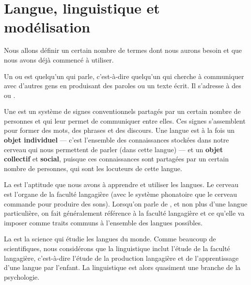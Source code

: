\section{Langue, linguistique et modélisation}\label{sec:1.1.7}

Nous allons définir un certain nombre de termes dont nous aurons besoin et que nous avons déjà commencé à utiliser.

\begin{styleLivreImportant}
Un  ou  est quelqu’un qui parle, c’est-à-dire quelqu’un qui cherche à communiquer avec d’autres gens en produisant des paroles ou un texte écrit. Il s’adresse à des  ou .
\end{styleLivreImportant}

\begin{styleLivreImportant}
Une  est un système de signes conventionnels partagés par un certain nombre de personnes et qui leur permet de communiquer entre elles. Ces signes s’assemblent pour former des mots, des phrases et des discours. Une langue est à la fois un \textbf{objet individuel} — c’est l’ensemble des connaissances stockées dans notre cerveau qui nous permettent de parler (dans cette langue) — et un \textbf{objet collectif} et \textbf{social}, puisque ces connaissances sont partagées par un certain nombre de personnes, qui sont les locuteurs de cette langue.
\end{styleLivreImportant}

\begin{styleLivreImportant}
La  est l’aptitude que nous avons à apprendre et utiliser les langues. Le cerveau est l’organe de la faculté langagière (avec le système phonatoire que le cerveau commande pour produire des sons). Lorsqu’on parle de , et non plus d’une langue particulière, on fait généralement référence à la faculté langagière et ce qu’elle va imposer comme traits communs à l’ensemble des langues possibles.
\end{styleLivreImportant}

\begin{styleLivreImportant}
La  est la science qui étudie les langues du monde. Comme beaucoup de scientifiques, nous considérons que la linguistique inclut l’étude de la faculté langagière, c’est-à-dire l’étude de la production langagière et de l’apprentissage d’une langue par l’enfant. La linguistique est alors quasiment une branche de la psychologie.
\end{styleLivreImportant}


